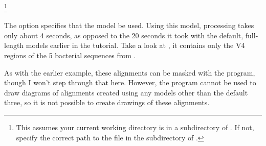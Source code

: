\footnote{This assumes your
  current working directory is in a subdirectory of .
  If not, specify the correct path to the  file
  in the  subdirectory of .}

The  option specifies that the model  be used. 
Using this model, processing  takes only about 4
seconds, as opposed to the 20 seconds it took with the default,
full-length models earlier in the tutorial. Take a look at
, it contains only the V4 regions
of the 5 bacterial sequences from . 

As with the earlier example, these alignments can be masked with the
 program, though I won't step through that
here. However, the  program cannot be used to draw
diagrams of alignments created using any models other than the default
three, so it is not possible to create drawings of these alignments.


